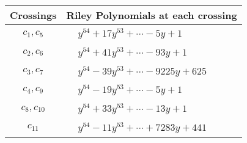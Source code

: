 \documentclass[1p]{elsarticle_modified}
\theoremstyle{definition}
\begin{document}
\begin{tabular}{m{50pt}|m{274pt}}
Crossings & \hspace{64pt}Riley Polynomials at each crossing \\
\hline $$\begin{aligned}c_{1},c_{5}\end{aligned}$$&$\begin{aligned}
&y^{54}+17 y^{53}+\cdots-5 y+1
\end{aligned}$\\
\hline $$\begin{aligned}c_{2},c_{6}\end{aligned}$$&$\begin{aligned}
&y^{54}+41 y^{53}+\cdots-93 y+1
\end{aligned}$\\
\hline $$\begin{aligned}c_{3},c_{7}\end{aligned}$$&$\begin{aligned}
&y^{54}-39 y^{53}+\cdots-9225 y+625
\end{aligned}$\\
\hline $$\begin{aligned}c_{4},c_{9}\end{aligned}$$&$\begin{aligned}
&y^{54}-19 y^{53}+\cdots-5 y+1
\end{aligned}$\\
\hline $$\begin{aligned}c_{8},c_{10}\end{aligned}$$&$\begin{aligned}
&y^{54}+33 y^{53}+\cdots-13 y+1
\end{aligned}$\\
\hline $$\begin{aligned}c_{11}\end{aligned}$$&$\begin{aligned}
&y^{54}-11 y^{53}+\cdots+7283 y+441
\end{aligned}$\\
\hline
\end{tabular}
\vskip 2pc
\end{document}
